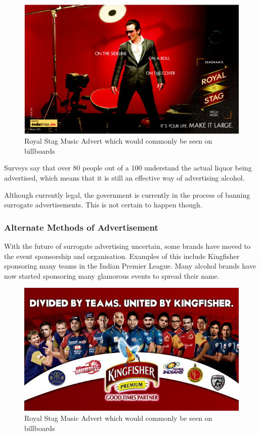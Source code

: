 \documentclass{article}
\begin{document}
\begin{figure}[h!]
	\caption{Royal Stag Music Advert which would commonly be seen on billboards}
	\centering
		\includegraphics[width=\textwidth]{royalstagad1.png}
\end{figure}

Surveys say that over 80 people out of a 100 understand the actual liquor being
advertised, which means that it is still an effective way of advertising alcohol.

Although currently legal, the government is currently in the process of banning
surrogate advertisements. This is not certain to happen though.

\subsubsection{Alternate Methods of Advertisement}
With the future of surrogate advertising uncertain, some brands have moved to
the event sponsorship and organisation. Examples of this include Kingfisher
sponsoring many teams in the Indian Premier League. Many alcohol brands
have now started sponsoring many glamorous events to spread their name.

\begin{figure}[h!]
	\caption{Royal Stag Music Advert which would commonly be seen on billboards}
	\centering
		\includegraphics[width=\textwidth]{ipl.jpg}
\end{figure}
\end{document}
